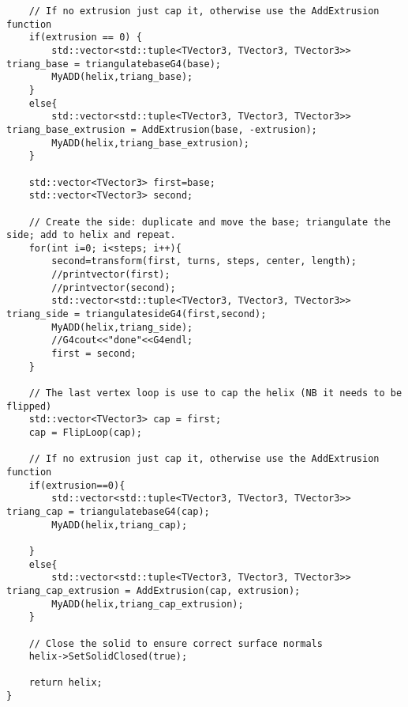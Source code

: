 \begin{lstlisting}
    // If no extrusion just cap it, otherwise use the AddExtrusion function
    if(extrusion == 0) {
        std::vector<std::tuple<TVector3, TVector3, TVector3>> triang_base = triangulatebaseG4(base);
	    MyADD(helix,triang_base);
    }
    else{
        std::vector<std::tuple<TVector3, TVector3, TVector3>> triang_base_extrusion = AddExtrusion(base, -extrusion);
        MyADD(helix,triang_base_extrusion);
    }

	std::vector<TVector3> first=base;
	std::vector<TVector3> second;

	// Create the side: duplicate and move the base; triangulate the side; add to helix and repeat. 
	for(int i=0; i<steps; i++){
		second=transform(first, turns, steps, center, length);
		//printvector(first);
		//printvector(second);
		std::vector<std::tuple<TVector3, TVector3, TVector3>> triang_side = triangulatesideG4(first,second);
		MyADD(helix,triang_side);
		//G4cout<<"done"<<G4endl;
		first = second; 
	}

	// The last vertex loop is use to cap the helix (NB it needs to be flipped)
    std::vector<TVector3> cap = first;
    cap = FlipLoop(cap);

    // If no extrusion just cap it, otherwise use the AddExtrusion function
    if(extrusion==0){
        std::vector<std::tuple<TVector3, TVector3, TVector3>> triang_cap = triangulatebaseG4(cap);
	    MyADD(helix,triang_cap);
	
    }
    else{
        std::vector<std::tuple<TVector3, TVector3, TVector3>> triang_cap_extrusion = AddExtrusion(cap, extrusion);
        MyADD(helix,triang_cap_extrusion);
    }
	
    // Close the solid to ensure correct surface normals
    helix->SetSolidClosed(true);

    return helix;
}
\end{lstlisting}
